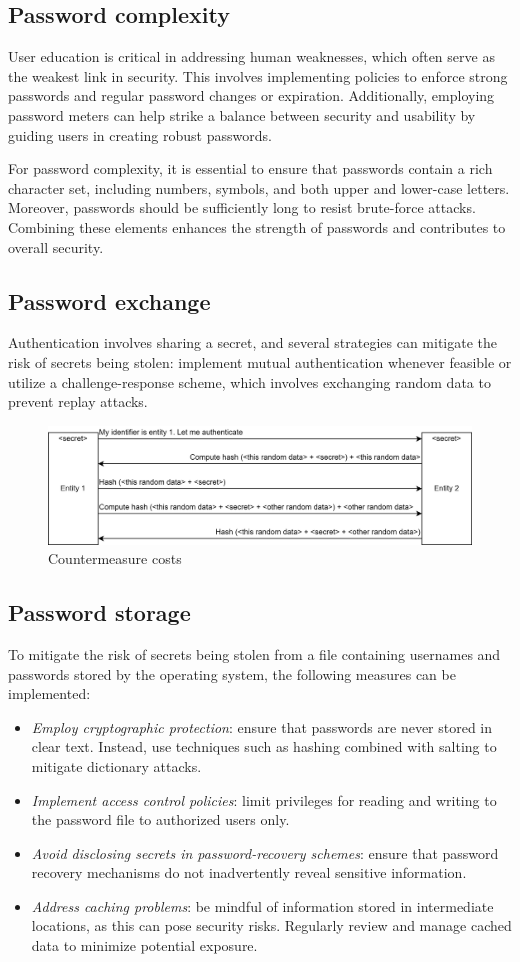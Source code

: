 \subsection{Password complexity}
User education is critical in addressing human weaknesses, which often serve as the weakest link in security. 
This involves implementing policies to enforce strong passwords and regular password changes or expiration.
Additionally, employing password meters can help strike a balance between security and usability by guiding users in creating robust passwords.

For password complexity, it is essential to ensure that passwords contain a rich character set, including numbers, symbols, and both upper and lower-case letters. 
Moreover, passwords should be sufficiently long to resist brute-force attacks. 
Combining these elements enhances the strength of passwords and contributes to overall security.

\subsection{Password exchange}
Authentication involves sharing a secret, and several strategies can mitigate the risk of secrets being stolen: implement mutual authentication whenever feasible or utilize a challenge-response scheme, which involves exchanging random data to prevent replay attacks.
\begin{figure}[H]
    \centering
    \includegraphics[width=0.75\linewidth]{images/auth2.png}
    \caption{Countermeasure costs}
\end{figure}

\subsection{Password storage}
To mitigate the risk of secrets being stolen from a file containing usernames and passwords stored by the operating system, the following measures can be implemented:
\begin{itemize}
    \item \textit{Employ cryptographic protection}: ensure that passwords are never stored in clear text. Instead, use techniques such as hashing combined with salting to mitigate dictionary attacks.
    \item \textit{Implement access control policies}: limit privileges for reading and writing to the password file to authorized users only.
    \item \textit{Avoid disclosing secrets in password-recovery schemes}: ensure that password recovery mechanisms do not inadvertently reveal sensitive information.
    \item \textit{Address caching problems}: be mindful of information stored in intermediate locations, as this can pose security risks. Regularly review and manage cached data to minimize potential exposure.
\end{itemize}

